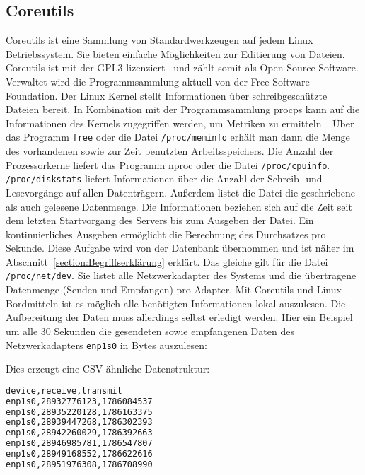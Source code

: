 \subsection{Coreutils}
Coreutils ist eine Sammlung von Standardwerkzeugen auf jedem Linux
Betriebssystem. Sie bieten einfache Möglichkeiten zur Editierung von Dateien.
Coreutils ist mit der GPL3 lizenziert~\cite{coreutils} und zählt somit als Open
Source Software. Verwaltet wird die Programmsammlung aktuell von der Free
Software Foundation. Der Linux Kernel stellt Informationen über
schreibgeschützte Dateien bereit. In Kombination mit der Programmsammlung
procps kann auf die Informationen des Kernels zugegriffen werden, um Metriken
zu ermitteln~\cite{procps}. Über das Programm \texttt{free} oder die Datei
\texttt{/proc/meminfo} erhält man dann die Menge des vorhandenen sowie zur Zeit
benutzten Arbeitsspeichers. Die Anzahl der Prozessorkerne liefert das Programm
nproc oder die Datei \texttt{/proc/cpuinfo}. \texttt{/proc/diskstats} liefert
Informationen über die Anzahl der Schreib- und Lesevorgänge auf allen
Datenträgern. Außerdem listet die Datei die geschriebene als auch gelesene
Datenmenge. Die Informationen beziehen sich auf die Zeit seit dem letzten
Startvorgang des Servers bis zum Ausgeben der Datei. Ein kontinuierliches
Ausgeben ermöglicht die Berechnung des Durchsatzes pro Sekunde. Diese Aufgabe
wird von der Datenbank übernommen und ist näher im
Abschnitt~\ref{section:Begriffserklärung} erklärt. Das gleiche gilt für die
Datei \texttt{/proc/net/dev}. Sie listet alle Netzwerkadapter des Systems und
die übertragene Datenmenge (Senden und Empfangen) pro Adapter. Mit Coreutils
und Linux Bordmitteln ist es möglich alle benötigten Informationen lokal
auszulesen. Die Aufbereitung der Daten muss allerdings selbst erledigt werden.
Hier ein Beispiel um alle 30 Sekunden die gesendeten sowie empfangenen Daten
des Netzwerkadapters \texttt{enp1s0} in Bytes auszulesen:



Dies erzeugt eine \gls{CSV} ähnliche Datenstruktur:

\begin{lstlisting}[language=bash,caption={traffic stats enp1s0}]
device,receive,transmit
enp1s0,28932776123,1786084537
enp1s0,28935220128,1786163375
enp1s0,28939447268,1786302393
enp1s0,28942260029,1786392663
enp1s0,28946985781,1786547807
enp1s0,28949168552,1786622616
enp1s0,28951976308,1786708990
\end{lstlisting}

